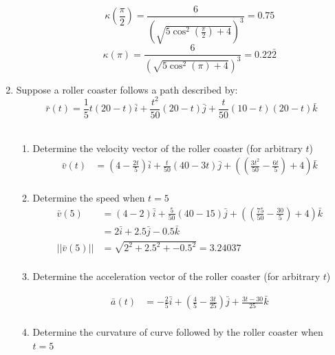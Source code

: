 \documentclass[a4paper,11pt]{article}
\begin{document}
\begin{enumerate}
\begin{enumerate}
        $$ \kappa(\frac{\pi}{2}) = \frac{6}{\left(\sqrt{5\cos^2(\frac{\pi}{2}) + 4}\right)^3}= 0.75$$
        $$ \kappa(\pi) = \frac{6}{\left(\sqrt{5\cos^2(\pi) + 4}\right)^3} = 0.22\bar{2}$$

    \end{enumerate}

    \newpage
    \item Suppose a roller coaster follows a path described by:
    $$ \bar{r}(t) = \frac{1}{5}t(20-t)\bar{i} + \frac{t^2}{50}(20-t)\bar{j} + \frac{t}{50}(10-t)(20-t)\bar{k} $$\\

    \begin{enumerate}
        \item Determine the velocity vector of the roller coaster (for arbitrary $t$)
        \begin{align*}
            \bar{v}(t) &= (4 - \frac{2t}{5}) \bar{i} + \frac{t}{50}(40-3t)\bar{j} + \left(\left(\frac{3t^2}{50}-\frac{6t}{5}\right)+4\right)\bar{k}\\
        \end{align*}

        \item Determine the speed when $t = 5$
        \begin{align*}
            \bar{v}(5) &= (4 - 2) \bar{i} + \frac{5}{50}(40-15)\bar{j} + \left(\left(\frac{75}{50}-\frac{30}{5}\right)+4\right)\bar{k}\\
            &= 2\bar{i} + 2.5\bar{j} - 0.5\bar{k}\\
            || \bar{v}(5) || &= \sqrt{2^2 + 2.5^2 + -0.5^2} = 3.24037\\
        \end{align*}

        \item  Determine the acceleration vector of the roller coaster (for arbitrary $t$)

        \begin{align*}
            \bar{a}(t) &= -\frac{2}{5}\bar{i} + (\frac{4}{5} - \frac{3t}{25})\bar{j} + \frac{3t-30}{25}\bar{k}\\
        \end{align*}

        \item Determine the curvature of curve followed by the roller coaster when $t = 5$
        

\end{enumerate}
\end{enumerate}
\end{document}

